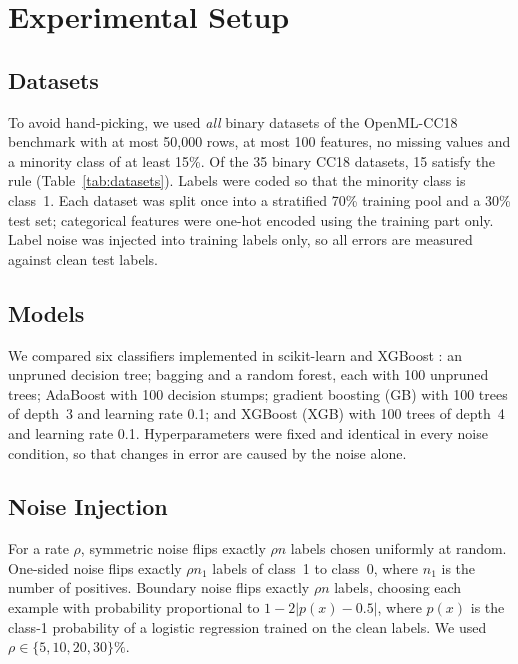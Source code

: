 \documentclass[conference,a4paper]{IEEEtran}
\begin{document}
\section{Experimental Setup}

\subsection{Datasets}
To avoid hand-picking, we used \emph{all} binary datasets of the OpenML-CC18 benchmark \cite{vanschoren2014,bischl2021} with at most 50{,}000 rows, at most 100 features, no missing values and a minority class of at least 15\%. Of the 35 binary CC18 datasets, 15 satisfy the rule (Table~\ref{tab:datasets}). Labels were coded so that the minority class is class~1. Each dataset was split once into a stratified 70\% training pool and a 30\% test set; categorical features were one-hot encoded using the training part only. Label noise was injected into training labels only, so all errors are measured against clean test labels.

\begin{table}[!t]
\caption{Datasets (OpenML-CC18), Ordered by Size. Pos.\ Is the Share of Class~1.}
\label{tab:datasets}
\centering
\footnotesize

\end{table}

\subsection{Models}
We compared six classifiers implemented in scikit-learn \cite{pedregosa2011} and XGBoost \cite{chen2016}: an unpruned decision tree; bagging and a random forest, each with 100 unpruned trees; AdaBoost with 100 decision stumps; gradient boosting (GB) with 100 trees of depth~3 and learning rate 0.1; and XGBoost (XGB) with 100 trees of depth~4 and learning rate 0.1. Hyperparameters were fixed and identical in every noise condition, so that changes in error are caused by the noise alone.

\subsection{Noise Injection}
For a rate $\rho$, symmetric noise flips exactly $\rho n$ labels chosen uniformly at random. One-sided noise flips exactly $\rho n_1$ labels of class~1 to class~0, where $n_1$ is the number of positives. Boundary noise flips exactly $\rho n$ labels, choosing each example with probability proportional to $1-2|p(x)-0.5|$, where $p(x)$ is the class-1 probability of a logistic regression trained on the clean labels. We used $\rho\in\{5,10,20,30\}\%$.
\end{document}
